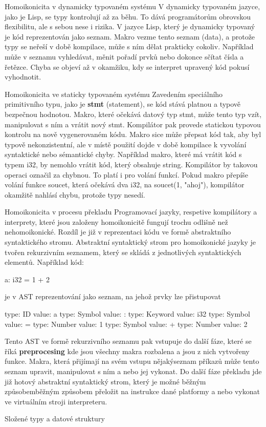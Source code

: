 \secc Homoikonicita v dynamicky typovaném systému
V dynamicky typovaném jazyce, jako je Lisp, se typy kontrolují až za běhu. To dává programátorům obrovskou flexibilitu, ale s sebou nese i rizika. V jazyce Lisp, který je dynamicky typovaný je kód reprezentován jako seznam. Makro vezme tento seznam (data), a protože typy se neřeší v době kompilace, může s ním dělat prakticky cokoliv. Například může v seznamu vyhledávat, měnit pořadí prvků nebo dokonce sčítat čísla a řetězce. Chyba se objeví až v okamžiku, kdy se interpret upravený kód pokusí vyhodnotit.

\secc Homoikonicita ve staticky typovaném systému
Zavedením speciálního primitivního typu, jako je {\bf stmt} (statement), se kód stává platnou a typově bezpečnou hodnotou. Makro, které očekává datový typ stmt, může tento typ vzít, manipulovat s ním a vrátit nový stmt. Kompilátor pak provede statickou typovou kontrolu na nově vygenerovaném kódu. Makro sice může přepsat kód tak, aby byl typově nekonzistentní, ale v místě použití dojde v době kompilace k vyvolání syntaktické nebo sémantické chyby. Například makro, které má vrátit kód s typem i32, by nemohlo vrátit kód, který obsahuje string. Kompilátor by takovou operaci označil za chybnou. To platí i pro volání funkcí. Pokud makro přepíše volání funkce soucet, která očekává dva i32, na soucet(1, "ahoj"), kompilátor okamžitě nahlásí chybu, protože typy nesedí.

\secc Homoikonicita v procesu překladu
Programovací jazyky, respetive kompilátory a interprety, které jsou založeny homoikonicitě fungují trochu odlišně než nehomoikonické. Rozdíl je již v reprezentaci kódu ve formě abstraktního syntaktického stromu. Abstraktní syntaktický strom pro homoikonické jazyky je tvořen rekurzivním seznamem, který se skládá z jednotlivých syntaktických elementů. Například kód:

\begtt
a: i32 = 1 + 2
\endtt

je v AST reprezentování jako seznam, na jehož prvky lze přistupovat 

\begtt
{ {type: ID value: a} {type: Symbol value: :} {type: Keyword value: i32} {type: Symbol value: =} { {type: Number value: 1} {type: Symbol value: +} {type: Number value: 2} } }
\endtt

Tento AST ve formě rekurzivního seznamu pak vstupuje do další fáze, které se říká {\bf preprocesing} kde jsou všechny makra rozbalena a jsou z nich vytvořeny funkce. Makra, která přijímají na svém vstupu nějakýseznam příkazů může tento seznam upravit, manipulovat s ním a nebo jej vykonat. Do další fáze překladu jde již hotový abstraktní syntaktický strom, který je možné běžným způsobemběžným způsobem  přeložit na instrukce dané platformy a nebo vykonat ve virtuálním stroji interpreteru.

\sec Složené typy a datové struktury


